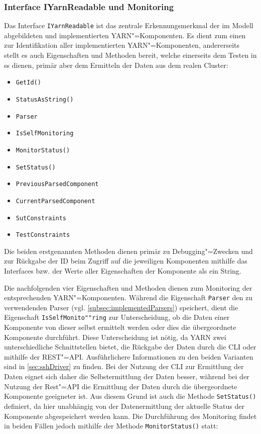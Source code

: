 \subsubsection{Interface IYarnReadable und Monitoring}
\label{subsubsec:yarnComponentInterface}

Das Interface \texttt{IYarnReadable} ist das zentrale Erkennungsmerkmal der im Modell abgebildeten und implementierten \ac{YARN}"=Komponenten.
Es dient zum einen zur Identifikation aller implementierten \ac{YARN}"=Komponenten, andererseits stellt es auch Eigenschaften und Methoden bereit, welche einerseits dem Testen in \ac{ss} dienen, primär aber dem Ermitteln der Daten aus dem realen Cluster:

\begin{itemize}
    \item \texttt{GetId()}
    \item \texttt{StatusAsString()}
    
    \item \texttt{Parser}
    \item \texttt{IsSelfMonitoring}
    \item \texttt{MonitorStatus()}
    \item \texttt{SetStatus()}
    
    \item \texttt{PreviousParsedComponent}
    \item \texttt{CurrentParsedComponent}
    \item \texttt{SutConstraints}
    \item \texttt{TestConstraints}
\end{itemize}

Die beiden erstgenannten Methoden dienen primär zu Debugging"=Zwecken und zur Rückgabe der ID beim Zugriff auf die jeweiligen Komponenten mithilfe das Interfaces bzw. der Werte aller Eigenschaften der Komponente als ein String.

Die nachfolgenden vier Eigenschaften und Methoden dienen zum Monitoring der entsprechenden \ac{YARN}"=Komponenten.
Während die Eigenschaft \texttt{Parser} den zu verwendenden Parser (vgl. \cref{subsec:implementedParsers}) speichert, dient die Eigenschaft \texttt{IsSelfMonito""ring} zur Unterscheidung, ob die Daten einer Komponente von dieser selbst ermittelt werden oder dies die übergeordnete Komponente durchführt.
Diese Unterscheidung ist nötig, da \ac{YARN} zwei unterschiedliche Schnittstellen bietet, die Rückgabe der Daten durch die \ac{CLI} oder mithilfe der REST"=API.
Ausführlichere Informationen zu den beiden Varianten sind in \cref{sec:sshDriver} zu finden.
Bei der Nutzung der \ac{CLI} zur Ermittlung der Daten eignet sich daher die Selbstermittlung der Daten besser, während bei der Nutzung der Rest"=API die Ermittlung der Daten durch die übergeordnete Komponente geeigneter ist.
Aus diesem Grund ist auch die Methode \texttt{SetStatus()} definiert, da hier unabhängig von der Datenermittlung der aktuelle Status der Komponente abgespeichert werden kann.
Die Durchführung des Monitoring findet in beiden Fällen jedoch mithilfe der Methode \texttt{MonitorStatus()} statt:

